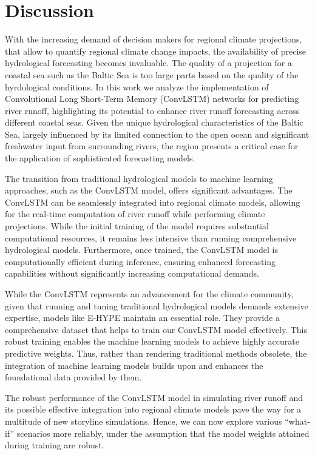 \documentclass[
]{agujournal2019}
\begin{document}
\hypertarget{discussion}{%
\section{Discussion}\label{discussion}}

With the increasing demand of decision makers for regional climate
projections, that allow to quantify regional climate change impacts, the
availability of precise hydrological forecasting becomes invaluable. The
quality of a projection for a coastal sea such as the Baltic Sea is too
large parts based on the quality of the hyrdological conditions. In this
work we analyze the implementation of Convolutional Long Short-Term
Memory (ConvLSTM) networks for predicting river runoff, highlighting its
potential to enhance river runoff forecasting across different coastal
seas. Given the unique hydrological characteristics of the Baltic Sea,
largely influenced by its limited connection to the open ocean and
significant freshwater input from surrounding rivers, the region
presents a critical case for the application of sophisticated
forecasting models.

The transition from traditional hydrological models to machine learning
approaches, such as the ConvLSTM model, offers significant advantages.
The ConvLSTM can be seamlessly integrated into regional climate models,
allowing for the real-time computation of river runoff while performing
climate projections. While the initial training of the model requires
substantial computational resources, it remains less intensive than
running comprehensive hydrological models. Furthermore, once trained,
the ConvLSTM model is computationally efficient during inference,
ensuring enhanced forecasting capabilities without significantly
increasing computational demands.

While the ConvLSTM represents an advancement for the climate community,
given that running and tuning traditional hydrological models demands
extensive expertise, models like E-HYPE maintain an essential role. They
provide a comprehensive dataset that helps to train our ConvLSTM model
effectively. This robust training enables the machine learning models to
achieve highly accurate predictive weights. Thus, rather than rendering
traditional methods obsolete, the integration of machine learning models
builds upon and enhances the foundational data provided by them.

The robust performance of the ConvLSTM model in simulating river runoff
and its possible effective integration into regional climate models pave
the way for a multitude of new storyline simulations. Hence, we can now
explore various ``what-if'' scenarios more reliably, under the
assumption that the model weights attained during training are robust.
\end{document}
